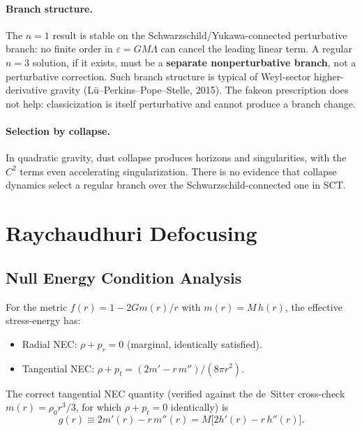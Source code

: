 \documentclass[11pt,a4paper]{article}
\theoremstyle{definition}
\theoremstyle{remark}
\newcommand{\Lam}{\Lambda}
\begin{document}
\paragraph{Branch structure.}
The $n = 1$ result is stable on the Schwarzschild/Yukawa-connected perturbative
branch: no finite order in $\varepsilon = GM\Lam$ can cancel the leading linear term.
A regular $n = 3$ solution, if it exists, must be a \textbf{separate nonperturbative
branch}, not a perturbative correction.  Such branch structure is typical of
Weyl-sector higher-derivative gravity (L\"u--Perkins--Pope--Stelle, 2015).
The fakeon prescription does not help: classicization is itself perturbative and
cannot produce a branch change.

\paragraph{Selection by collapse.}
In quadratic gravity, dust collapse produces horizons and singularities, with the
$C^2$ terms even accelerating singularization.  There is no evidence that collapse
dynamics select a regular branch over the Schwarzschild-connected one in SCT.

\section{Raychaudhuri Defocusing}

\subsection{Null Energy Condition Analysis}

For the metric $f(r) = 1 - 2Gm(r)/r$ with $m(r) = M\,h(r)$, the effective
stress-energy has:
\begin{itemize}
  \item Radial NEC: $\rho + p_r = 0$ (marginal, identically satisfied).
  \item Tangential NEC: $\rho + p_t = (2m' - r\,m'')/(8\pi r^2)$.
\end{itemize}

The correct tangential NEC quantity (verified against the de~Sitter cross-check
$m(r) = \rho_0 r^3/3$, for which $\rho + p_t = 0$ identically) is
\begin{equation}
  g(r) \equiv 2m'(r) - r\,m''(r) = M\bigl[2h'(r) - r\,h''(r)\bigr].
\end{equation}
\end{document}
